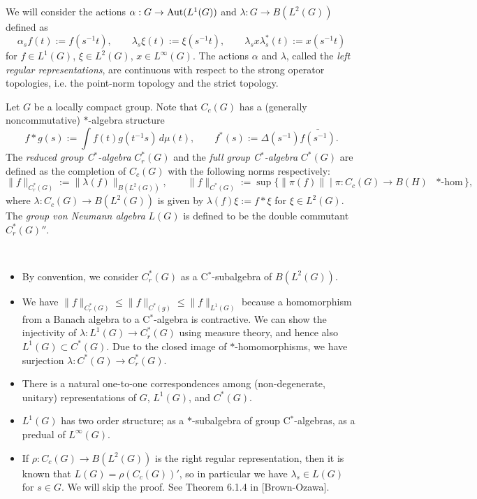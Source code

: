 \documentclass{../../../small}
\begin{document}
\begin{defn}
We will consider the actions $\alpha:G\to\operatorname{Aut}(L^1(G))$ and $\lambda:G\to B(L^2(G))$ defined as
\[\alpha_sf(t):=f(s^{-1}t),\qquad \lambda_s\xi(t):=\xi(s^{-1}t),\qquad \lambda_sx\lambda_s^*(t):=x(s^{-1}t)\]
for $f\in L^1(G)$, $\xi\in L^2(G)$, $x\in L^\infty(G)$.
The actions $\alpha$ and $\lambda$, called the \emph{left regular representations}, are continuous with respect to the strong operator topologies, i.e. the point-norm topology and the strict topology.
\end{defn}

\begin{defn}
Let $G$ be a locally compact group.
Note that $C_c(G)$ has a (generally noncommutative) $*$-algebra structure
\[f*g(s):=\int f(t)g(t^{-1}s)\,d\mu(t),\qquad f^*(s):=\Delta(s^{-1})\bar{f(s^{-1})}.\]
The \emph{reduced group C$^*$-algebra} $C_r^*(G)$ and the \emph{full group C$^*$-algebra} $C^*(G)$ are defined as the completion of $C_c(G)$ with the following norms respectively:
\[\|f\|_{C_r^*(G)}:=\|\lambda(f)\|_{B(L^2(G))},\qquad\|f\|_{C^*(G)}:=\sup\{\|\pi(f)\|\mid\pi:C_c(G)\to B(H)\text{ $*$-hom}\},\]
where $\lambda:C_c(G)\to B(L^2(G))$ is given by $\lambda(f)\xi:=f*\xi$ for $\xi\in L^2(G)$.
The \emph{group von Neumann algebra} $L(G)$ is defined to be the double commutant $C_r^*(G)''$.
\end{defn}

\begin{rmk*}\,
\begin{itemize}
\item By convention, we consider $C_r^*(G)$ as a C$^*$-subalgebra of $B(L^2(G))$.
\item We have $\|f\|_{C_r^*(G)}\le\|f\|_{C^*(g)}\le\|f\|_{L^1(G)}$ because a homomorphism from a Banach algebra to a C$^*$-algebra is contractive. We can show the injectivity of $\lambda:L^1(G)\to C_r^*(G)$ using measure theory, and hence also $L^1(G)\subset C^*(G)$. Due to the closed image of $*$-homomorphisms, we have surjection $\lambda:C^*(G)\to C_r^*(G)$.
\item There is a natural one-to-one correspondences among (non-degenerate, unitary) representations of $G$, $L^1(G)$, and $C^*(G)$.
\item $L^1(G)$ has two order structure; as a $*$-subalgebra of group C$^*$-algebras, as a predual of $L^\infty(G)$.
\item If $\rho:C_c(G)\to B(L^2(G))$ is the right regular representation, then it is known that $L(G)=\rho(C_c(G))'$, so in particular we have $\lambda_s\in L(G)$ for $s\in G$. We will skip the proof. See Theorem 6.1.4 in [Brown-Ozawa].
\end{itemize}	
\end{rmk*}
\end{document}

